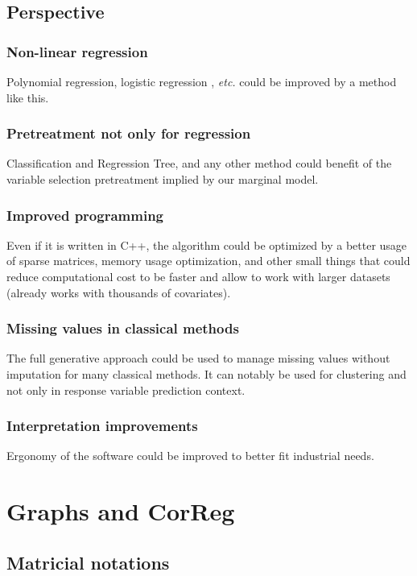 \documentclass[12pt,a4paper]{report}
\begin{document}
		
	\section{Perspective}
		\subsection{Non-linear regression}
			Polynomial regression, logistic regression \cite{hosmer2000applied}, {\it etc.} could be improved by a method like this.
		\subsection{Pretreatment not only for regression}
			Classification and Regression Tree, and any other method could benefit of the variable selection pretreatment implied by our marginal model.
		\subsection{Improved programming}
			Even if it is written in C++, the algorithm could be optimized by a better usage of sparse matrices, memory usage optimization, and other small things that could reduce computational cost to be faster and allow to work with larger datasets (already works with thousands of covariates).
		\subsection{Missing values in classical methods}
			The full generative approach could be used to manage missing values without imputation for many classical methods.
			It can notably be used for clustering and not only in response variable prediction context.
		\subsection{Interpretation improvements}
			Ergonomy of the software could be improved to better fit industrial needs.
\cleardoublepage



\appendix
	\chapter{Graphs and CorReg}
		\section{Matricial notations}
\end{document}
